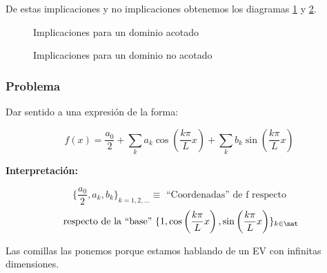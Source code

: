 		De estas implicaciones y no implicaciones obtenemos los diagramas \ref{fig:diagramaConvergenciasAcotado} y \ref{fig:diagramaConvergenciasNoAcotado}.

		\begin{figure}[thbp]
		\centering
		\caption{Implicaciones para un dominio acotado}
		\label{fig:diagramaConvergenciasAcotado}
		\end{figure}

		\begin{figure}[thbp]
		\centering
		\caption{Implicaciones para un dominio no acotado}
		\label{fig:diagramaConvergenciasNoAcotado}
		\end{figure}

	\subsubsection*{Problema}

		Dar sentido a una expresión de la forma:

		\[ f(x) = \frac{a_0}{2}+ \sum_k a_k \cos \left( \frac{k \pi}{L} x \right) + \sum_k b_k \sin \left( \frac{k \pi}{L} x \right) \]

		\textbf{Interpretación:}

		\[
		\{\frac{a_0}{2},a_k,b_k\}_{k=1,2,…} \equiv \text{ ``Coordenadas'' de f respecto}\]
		\[\text{ respecto de la ``base'' } \{1, \cos \left( \frac{k \pi}{L} x \right), \sin \left( \frac{k \pi}{L} x \right) \}_{k \in \nat }\]

		\obs Las comillas las ponemos porque estamos hablando de un EV con infinitas dimensiones.

